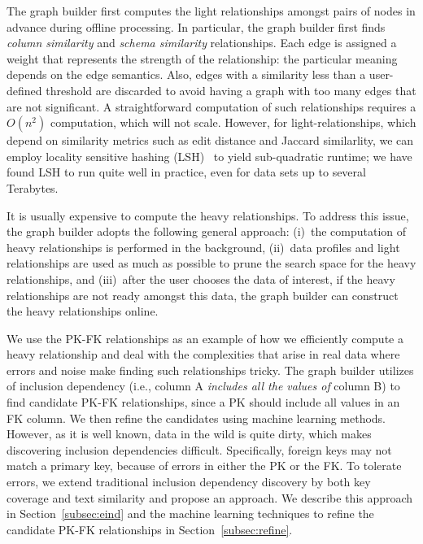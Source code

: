 The graph builder first computes the light relationships amongst pairs of nodes
in advance during offline processing. In particular, the graph builder first
finds \emph{column similarity} and \emph{schema similarity} relationships.  Each
edge is assigned a weight that represents the strength of the relationship: the
particular meaning depends on the edge semantics. Also, edges with a similarity
less than a user-defined threshold are discarded to avoid having a graph with
too many edges that are not significant.  A straightforward computation of such
relationships requires a $O(n^2)$ computation, which will not scale. However,
for light-relationships, which depend on similarity metrics such as edit
distance and Jaccard similarlity, we can employ locality sensitive hashing
(LSH)~\cite{DBLP:conf/compgeom/DatarIIM04} to yield sub-quadratic runtime; we
have found LSH to run quite well in practice, even for data sets up to several
Terabytes.

It is usually expensive to compute the heavy relationships. To address this
issue, the graph builder adopts the following general approach: (i)~the
computation of heavy relationships is performed in the background, (ii)~data
profiles and light relationships are used as much as possible to prune the
search space for the heavy relationships, and (iii)~after the user chooses the
data of interest, if the heavy relationships are not ready amongst this data,
the graph builder can construct the heavy relationships online.

We use the PK-FK relationships as an example of how we efficiently compute a
heavy relationship and deal with the complexities that arise in real data where
errors and noise make finding such relationships tricky. The graph builder
utilizes 
of inclusion dependency (i.e., column A {\it includes
all the values of} column B) to find candidate PK-FK relationships, since a PK
should include all values in an FK column. We then refine the candidates using
machine learning methods. However, as it is well known, data in the wild is
quite dirty, which makes discovering inclusion dependencies difficult.
Specifically, foreign keys may not match a primary key, because of errors in
either the PK or the FK. To tolerate errors, we extend traditional inclusion
dependency discovery by both key coverage and text similarity and propose an
\emph{\eind} approach.  We describe this approach in Section~\ref{subsec:eind}
and the machine learning techniques to refine the candidate PK-FK relationships
in Section~\ref{subsec:refine}.

